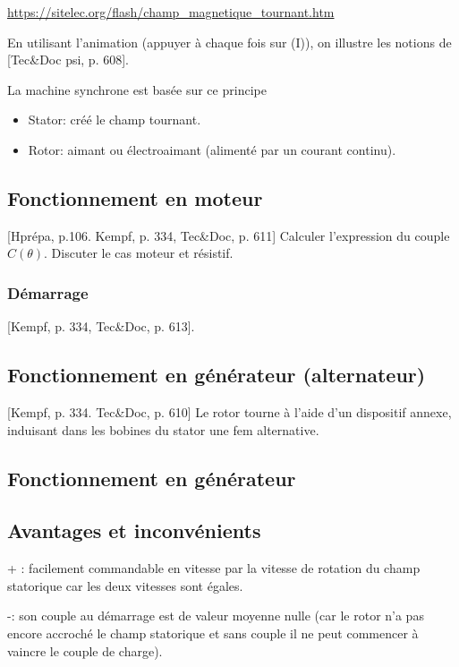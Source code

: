 \documentclass[11pt]{report}
\numberwithin{figure}{section}
\numberwithin{equation}{section}
\numberwithin{table}{section}
\newcommand{\1}{\boldsymbol{1}}
\begin{document}
\url{https://sitelec.org/flash/champ_magnetique_tournant.htm}

En utilisant l'animation (appuyer à chaque fois sur (I)), on illustre les notions de [Tec\&Doc psi, p. 608].

La machine synchrone est basée sur ce principe
\begin{itemize}
\item Stator: créé le champ tournant.
\item Rotor: aimant ou électroaimant (alimenté par un courant continu).
\end{itemize}

\subsection{Fonctionnement en moteur}

[Hprépa, p.106. Kempf, p. 334, Tec\&Doc, p. 611] Calculer l'expression du couple $C(\theta)$. Discuter le cas moteur et résistif.  

\subsubsection{Démarrage} [Kempf, p. 334, Tec\&Doc, p. 613].

\subsection{Fonctionnement en générateur (alternateur)}

[Kempf, p. 334. Tec\&Doc, p. 610] Le rotor tourne à l'aide d'un dispositif annexe, induisant dans les bobines du stator une fem alternative.

\subsection{Fonctionnement en générateur}

\subsection{Avantages et inconvénients}

+ : facilement commandable en vitesse par la vitesse de rotation du champ statorique car les deux vitesses sont égales. \newline
 
-: son couple au démarrage est de valeur moyenne nulle (car le rotor n'a pas encore accroché le champ statorique et sans couple il ne peut commencer à vaincre le couple de charge).
\end{document}
